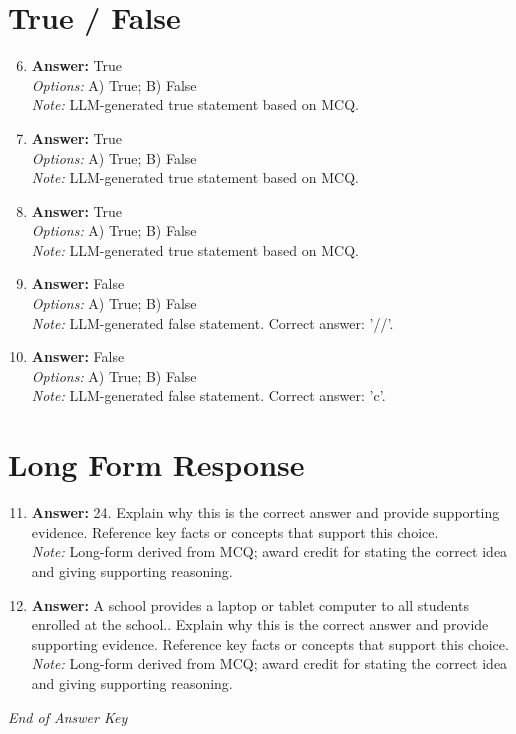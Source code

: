 \documentclass[12pt]{article}
\begin{document}
\section*{True / False}
\begin{enumerate}[label=\arabic*.]
\setcounter{enumi}{5}
\item \textbf{Answer:} True
\\ \textit{Options:} A) True; B) False
\\ \textit{Note:} LLM-generated true statement based on MCQ.
\item \textbf{Answer:} True
\\ \textit{Options:} A) True; B) False
\\ \textit{Note:} LLM-generated true statement based on MCQ.
\item \textbf{Answer:} True
\\ \textit{Options:} A) True; B) False
\\ \textit{Note:} LLM-generated true statement based on MCQ.
\item \textbf{Answer:} False
\\ \textit{Options:} A) True; B) False
\\ \textit{Note:} LLM-generated false statement. Correct answer: '//'.
\item \textbf{Answer:} False
\\ \textit{Options:} A) True; B) False
\\ \textit{Note:} LLM-generated false statement. Correct answer: 'c'.
\end{enumerate}

\section*{Long Form Response}
\begin{enumerate}[label=\arabic*.]
\setcounter{enumi}{10}
\item \textbf{Answer:} 24. Explain why this is the correct answer and provide supporting evidence. Reference key facts or concepts that support this choice.
\\ \textit{Note:} Long-form derived from MCQ; award credit for stating the correct idea and giving supporting reasoning.
\item \textbf{Answer:} A school provides a laptop or tablet computer to all students enrolled at the school.. Explain why this is the correct answer and provide supporting evidence. Reference key facts or concepts that support this choice.
\\ \textit{Note:} Long-form derived from MCQ; award credit for stating the correct idea and giving supporting reasoning.
\end{enumerate}

\vfill
\noindent\textit{End of Answer Key}
\end{document}
